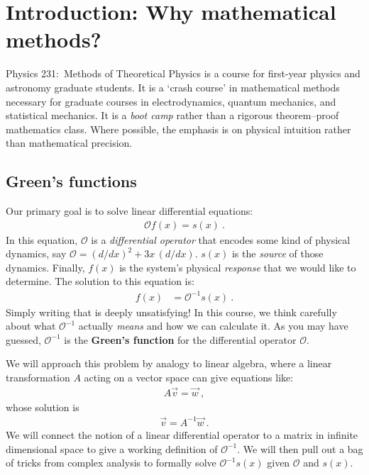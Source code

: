 
\section{Introduction: Why mathematical methods?}

Physics 231:~Methods of Theoretical Physics is a course for first-year physics and astronomy graduate students. It is a `crash course’ in mathematical methods necessary for graduate courses in electrodynamics, quantum mechanics, and statistical mechanics. It is a \emph{boot camp} rather than a rigorous theorem--proof mathematics class. Where possible, the emphasis is on physical intuition rather than mathematical precision. 

\subsection{Green’s functions}

Our primary goal is to solve linear differential equations:
\begin{align}
  \mathcal O f(x) = s(x) \ .
\end{align}
In this equation, $\mathcal O$ is a \emph{differential operator} that encodes some kind of physical dynamics, say $\mathcal O = (d/dx)^2 + 3x\,(d/dx)$.  $s(x)$ is the \emph{source} of those dynamics. Finally, $f(x)$ is the system's physical \emph{response} that we would like to determine. The solution to this equation is:
\begin{align}
  f(x) &= \mathcal O^{-1} s(x) \ .
\end{align}
Simply writing that is deeply unsatisfying! %
In this course, we think carefully about what $\mathcal O^{-1}$ actually \emph{means} and how we can calculate it. As you may have guessed, $\mathcal O^{-1}$ is the \textbf{Green's function} for the differential operator $\mathcal O$. 

We will approach this problem by analogy to linear algebra, where a linear transformation $A$ acting on a vector space can give equations like:
\begin{align}
  A \vec{v} = \vec{w} \ ,
\end{align}
whose solution is
\begin{align}
  \vec{v} = A^{-1} \vec{w} \ .
\end{align}
We will connect the notion of a linear differential operator to a matrix in infinite dimensional space to give a working definition of $\mathcal O^{-1}$. We will then pull out a bag of tricks from complex analysis to formally solve $\mathcal O^{-1}s(x)$ given $\mathcal O$ and $s(x)$. 

